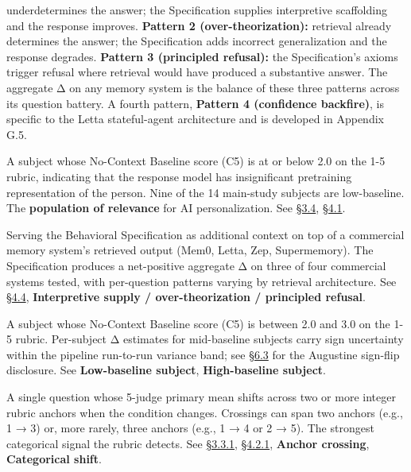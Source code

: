 \begin{description}
underdetermines the answer; the Specification supplies interpretive
scaffolding and the response improves. \textbf{Pattern 2
(over-theorization):} retrieval already determines the answer; the
Specification adds incorrect generalization and the response degrades.
\textbf{Pattern 3 (principled refusal):} the Specification's axioms
trigger refusal where retrieval would have produced a substantive
answer. The aggregate Δ on any memory system is the balance of these
three patterns across its question battery. A fourth pattern,
\textbf{Pattern 4 (confidence backfire)}, is specific to the Letta
stateful-agent architecture and is developed in Appendix G.5.
\item[Low-baseline subject]
A subject whose No-Context Baseline score (C5) is at or below 2.0 on the
1-5 rubric, indicating that the response model has insignificant
pretraining representation of the person. Nine of the 14 main-study
subjects are low-baseline. The \textbf{population of relevance} for AI
personalization. See \hyperref[subjects]{§3.4}, \hyperref[the-cross-subject-gradient-and-its-per-question-mechanism]{§4.1}.
\item[Memory-system layering]
Serving the Behavioral Specification as additional context on top of a
commercial memory system's retrieved output (Mem0, Letta, Zep,
Supermemory). The Specification produces a net-positive aggregate Δ on
three of four commercial systems tested, with per-question patterns
varying by retrieval architecture. See \hyperref[memory-system-composition]{§4.4}, \textbf{Interpretive supply
/ over-theorization / principled refusal}.
\item[Mid-baseline subject]
A subject whose No-Context Baseline score (C5) is between 2.0 and 3.0 on
the 1-5 rubric. Per-subject Δ estimates for mid-baseline subjects carry
sign uncertainty within the pipeline run-to-run variance band; see \hyperref[pipeline-and-specification-stability]{§6.3}
for the Augustine sign-flip disclosure. See \textbf{Low-baseline
subject}, \textbf{High-baseline subject}.
\item[Multi-anchor crossing]
A single question whose 5-judge primary mean shifts across two or more
integer rubric anchors when the condition changes. Crossings can span
two anchors (e.g., 1 → 3) or, more rarely, three anchors (e.g., 1 → 4 or
2 → 5). The strongest categorical signal the rubric detects. See \hyperref[score-interpretation]{§3.3.1},
\hyperref[per-question-improvement-rate]{§4.2.1}, \textbf{Anchor crossing}, \textbf{Categorical shift}.
\item[No-Context Baseline (C5)]

\end{description}
